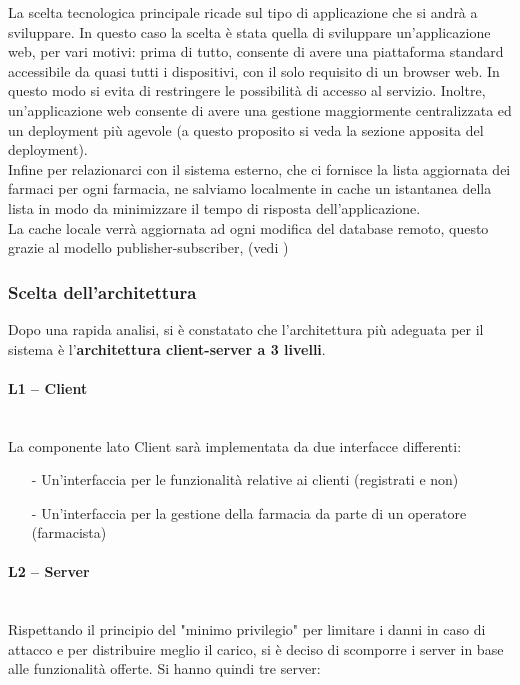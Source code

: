 La scelta tecnologica principale ricade sul tipo di applicazione che si andrà a
sviluppare.  In questo caso la scelta è stata quella di sviluppare
un'applicazione web, per vari motivi: prima di tutto, consente di avere una
piattaforma standard accessibile da quasi tutti i dispositivi, con il solo
requisito di un browser web. In questo modo si evita di restringere le
possibilità di accesso al servizio.  Inoltre, un'applicazione web consente di
avere una gestione maggiormente centralizzata ed un deployment più agevole (a
questo proposito si veda la sezione apposita del deployment). \\
Infine per relazionarci con il sistema esterno, che ci fornisce la lista aggiornata dei
farmaci per ogni farmacia, ne salviamo localmente in cache un istantanea della lista in
modo da minimizzare il tempo di risposta dell'applicazione.\\
La cache locale verrà aggiornata ad ogni modifica del database remoto, questo
grazie al modello publisher-subscriber, (vedi )

\subsubsection{Scelta dell'architettura}

Dopo una rapida analisi, si è constatato che l'architettura più adeguata per il
sistema è l'\textbf{architettura client-server a 3 livelli}.

\paragraph{L1 -- Client}\mbox{}\\
La componente lato Client sarà implementata da due interfacce differenti:

\begin{itemize}
\item[-] Un'interfaccia per le funzionalità relative ai clienti (registrati e non)
\item[-] Un'interfaccia per la gestione della farmacia da parte di un operatore (farmacista)
\end{itemize}

\paragraph{L2 -- Server}\mbox{}\\
Rispettando il principio del "minimo privilegio" per limitare i danni in caso di attacco e per distribuire meglio il carico, si è deciso di scomporre i server in base alle funzionalità offerte. Si hanno quindi tre server:

